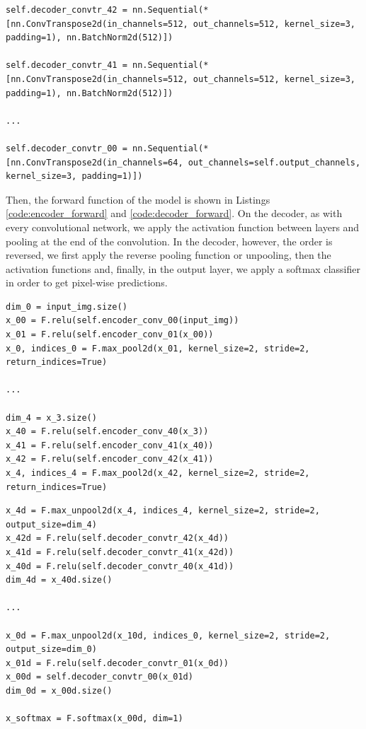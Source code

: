 \begin{lstlisting}[style=Python-color, caption=First layers of the SegNet decoder, frame=single, label=code:decoder]
self.decoder_convtr_42 = nn.Sequential(*[nn.ConvTranspose2d(in_channels=512, out_channels=512, kernel_size=3, padding=1), nn.BatchNorm2d(512)])

self.decoder_convtr_41 = nn.Sequential(*[nn.ConvTranspose2d(in_channels=512, out_channels=512, kernel_size=3, padding=1), nn.BatchNorm2d(512)])

...

self.decoder_convtr_00 = nn.Sequential(*[nn.ConvTranspose2d(in_channels=64, out_channels=self.output_channels, kernel_size=3, padding=1)])

\end{lstlisting}

Then, the forward function of the model is shown in Listings \ref{code:encoder_forward} and \ref{code:decoder_forward}. On the decoder, as with every convolutional network, we apply the activation function between layers and pooling at the end of the convolution. In the decoder, however, the order is reversed, we first apply the reverse pooling function or unpooling, then the activation functions and, finally, in the output layer, we apply a softmax classifier in order to get pixel-wise predictions.

\begin{lstlisting}[style=Python-color, caption=Forward function on the encoder, frame=single, label=code:encoder_forward]
dim_0 = input_img.size()
x_00 = F.relu(self.encoder_conv_00(input_img))
x_01 = F.relu(self.encoder_conv_01(x_00))
x_0, indices_0 = F.max_pool2d(x_01, kernel_size=2, stride=2, return_indices=True)

...

dim_4 = x_3.size()
x_40 = F.relu(self.encoder_conv_40(x_3))
x_41 = F.relu(self.encoder_conv_41(x_40))
x_42 = F.relu(self.encoder_conv_42(x_41))
x_4, indices_4 = F.max_pool2d(x_42, kernel_size=2, stride=2, return_indices=True)

\end{lstlisting}

\begin{lstlisting}[style=Python-color, caption=Forward function on the decoder, frame=single, label=code:decoder_forward]
x_4d = F.max_unpool2d(x_4, indices_4, kernel_size=2, stride=2, output_size=dim_4)
x_42d = F.relu(self.decoder_convtr_42(x_4d))
x_41d = F.relu(self.decoder_convtr_41(x_42d))
x_40d = F.relu(self.decoder_convtr_40(x_41d))
dim_4d = x_40d.size()

...

x_0d = F.max_unpool2d(x_10d, indices_0, kernel_size=2, stride=2, output_size=dim_0)
x_01d = F.relu(self.decoder_convtr_01(x_0d))
x_00d = self.decoder_convtr_00(x_01d)
dim_0d = x_00d.size()

x_softmax = F.softmax(x_00d, dim=1)

\end{lstlisting}

